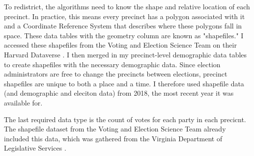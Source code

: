 To redistrict, the algorithms need to know the shape and relative location of each precinct. In practice, this means every precinct has a polygon associated with it and a Coordinate Reference System that describes where these polygons fall in space. These data tables with the geometry column are known as "shapefiles." I accessed these shapefiles from the Voting and Election Science Team on their Harvard Dataverse \parencite{votingandelectionscienceteam2019c}. I then merged in my precinct-level demographic data tables to create shapefiles with the necessary demographic data. Since election administrators are free to change the precincts between elections, precinct shapefiles are unique to both a place and a time. I therefore used shapefile data (and demographic and eleciton data) from 2018, the most recent year it was available for.

The last required data type is the count of votes for each party in each precicnt. The shapefile dataset from the Voting and Election Science Team already included this data, which was gathered from the Virginia Department of Legislative Services \parencite{votingandelectionscienceteam2019c}.